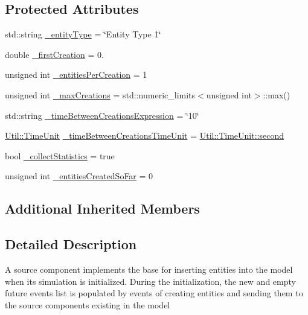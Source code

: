 \subsection*{Protected Attributes}
\begin{DoxyCompactItemize}
\item 
std\-::string \hyperlink{class_source_model_component_ad001e8ae30c828916f271ac72c7817d1}{\-\_\-entity\-Type} = \char`\"{}Entity Type 1\char`\"{}
\item 
double \hyperlink{class_source_model_component_ad58dddde2b6a81d85f261fa8a11243b3}{\-\_\-first\-Creation} = 0.
\item 
unsigned int \hyperlink{class_source_model_component_a68b0576903281a4716eb3ea0281dd133}{\-\_\-entities\-Per\-Creation} = 1
\item 
unsigned int \hyperlink{class_source_model_component_a99525d31bdc32efd5bbdcfbbbf115ec5}{\-\_\-max\-Creations} = std\-::numeric\-\_\-limits$<$unsigned int$>$\-::max()
\item 
std\-::string \hyperlink{class_source_model_component_ab0c96af4d61d8125773fa41cff865211}{\-\_\-time\-Between\-Creations\-Expression} = \char`\"{}10\char`\"{}
\item 
\hyperlink{class_util_a28504cc2fecc9aa47154cba4e625ec6f}{Util\-::\-Time\-Unit} \hyperlink{class_source_model_component_af34df20551bc223eb103ca87e9f1463e}{\-\_\-time\-Between\-Creations\-Time\-Unit} = \hyperlink{class_util_a28504cc2fecc9aa47154cba4e625ec6faa9f0e61a137d86aa9db53465e0801612}{Util\-::\-Time\-Unit\-::second}
\item 
bool \hyperlink{class_source_model_component_ac0c009ff9a2e8169d251118dabcd19eb}{\-\_\-collect\-Statistics} = true
\item 
unsigned int \hyperlink{class_source_model_component_af1f4fb38d2c0c4ac08235d7aec131bc9}{\-\_\-entities\-Created\-So\-Far} = 0
\end{DoxyCompactItemize}
\subsection*{Additional Inherited Members}


\subsection{Detailed Description}
A source component implements the base for inserting entities into the model when its simulation is initialized. During the initialization, the new and empty future events list is populated by events of creating entities and sending them to the source components existing in the model 

